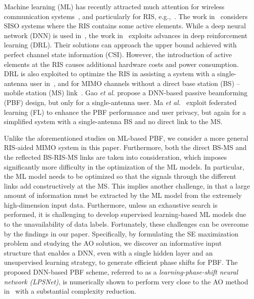 \documentclass[conference]{IEEEtran}
\begin{document}
	Machine learning (ML) has recently attracted much attention for wireless communication systems~\cite{pham2020intelligent, nguyen2020application, nguyen2020dnn}, and particularly for RIS, e.g.,~\cite{taha2019deep, Taha2020Deep,Feng2020Deep,Huang2020Reconfigurable,Gao2020Unsupervised,Ma2020Distributed}. The work in~\cite{taha2019deep, Taha2020Deep} considers SISO systems where the RIS contains some active elements. While a deep neural network (DNN) is used in~\cite{taha2019deep}, the work in~\cite{Taha2020Deep} exploits advances in deep reinforcement learning (DRL). Their solutions can approach the upper bound achieved with perfect channel state information (CSI). However, the introduction of active elements at the RIS causes additional hardware costs and power consumption. DRL is also exploited to optimize the RIS in assisting a system with a single-antenna user in~\cite{Feng2020Deep}, and for MIMO channels without a direct base station (BS) -- mobile station (MS) link~\cite{Huang2020Reconfigurable}. Gao \textit{et al.} \cite{Gao2020Unsupervised} propose a DNN-based passive beamforming (PBF) design, but only for a single-antenna user. Ma \textit{et al.}~\cite{Ma2020Distributed} exploit federated learning (FL) to enhance the PBF performance and user privacy, but again for a simplified system with a single-antenna BS and no direct link to the MS.
	
	Unlike the aforementioned studies on ML-based PBF, we consider a more general RIS-aided MIMO system in this paper. Furthermore, both the direct BS-MS and the reflected BS-RIS-MS links are taken into consideration, which imposes significantly more difficulty in the optimization of the ML models. In particular, the ML model needs to be optimized so that the signals through the different links add constructively at the MS. This implies another challenge, in that a large amount of information must be extracted by the ML model from the extremely high-dimension input data. Furthermore, unless an exhaustive search is performed, it is challenging to develop supervised learning-based ML models due to the unavailability of data labels. Fortunately, these challenges can be overcome by the findings in our paper. Specifically, by formulating the SE maximization problem and studying the AO solution, we discover an informative input structure that enables a DNN, even with a single hidden layer and an unsupervised learning strategy, to generate efficient phase shifts for PBF. The proposed DNN-based PBF scheme, referred to as a \textit{learning-phase-shift neural network (LPSNet)}, is numerically shown to perform very close to the AO method in~\cite{zhang2020capacity} with a substantial complexity reduction.
	
\end{document}
